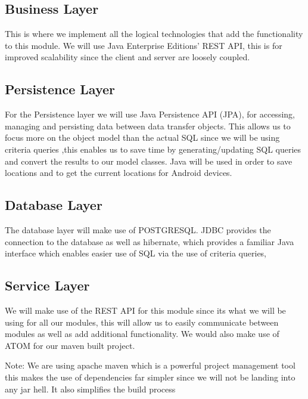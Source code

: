 \documentclass{article}
\begin{document}
		\subsection{Business Layer}
		This is where we implement all the logical technologies that add the functionality to this module. We will use Java Enterprise Editions' REST API, this is for improved scalability since the client and server are loosely coupled.
		
		\subsection{Persistence Layer}
		For the Persistence layer we will use Java Persistence API (JPA), for accessing, managing and persisting data between data transfer objects. This allows us to focus more on the object model than the actual SQL since we will be using criteria queries ,this enables us to save time by generating/updating SQL queries and convert the results to our model classes.
		Java will be used in order to save locations and to get the current locations for Android devices.
		
		\subsection{Database Layer}
		The database layer will make use of POSTGRESQL. JDBC provides the connection to the database as well as hibernate, which provides a familiar Java interface which enables easier use of SQL via the use of criteria queries, 
	
		
		\subsection{Service Layer}
		We will make use of the REST API for this module since its what we will be using for all our modules, this will allow us to easily communicate between modules as well as add additional functionality. We would also make use of ATOM for our maven built project. 

		Note: We are using apache maven which is a powerful project management tool this makes the use of dependencies far simpler since we will not be landing into any jar hell. It also simplifies the build process
 	
	 \newpage
 	
\end{document}
